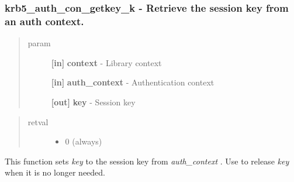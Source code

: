 \documentclass[letterpaper,10pt,english]{sphinxmanual}
\begin{document}
\subsubsection{krb5\_auth\_con\_getkey\_k -  Retrieve the session key from an auth context.}
\label{appdev/refs/api/krb5_auth_con_getkey_k:krb5-auth-con-getkey-k-retrieve-the-session-key-from-an-auth-context}\label{appdev/refs/api/krb5_auth_con_getkey_k::doc}

\begin{fulllineitems}
\label{appdev/refs/api/krb5_auth_con_getkey_k:c.krb5_auth_con_getkey_k}
\end{fulllineitems}

\begin{quote}\begin{description}
\item[{param}] \leavevmode
\textbf{{[}in{]}} \textbf{context} - Library context

\textbf{{[}in{]}} \textbf{auth\_context} - Authentication context

\textbf{{[}out{]}} \textbf{key} - Session key

\end{description}\end{quote}
\begin{quote}\begin{description}
\item[{retval}] \leavevmode\begin{itemize}
\item {} 
0   (always)

\end{itemize}

\end{description}\end{quote}

This function sets \emph{key} to the session key from \emph{auth\_context} . Use {\hyperref[appdev/refs/api/krb5_k_free_key:c.krb5_k_free_key]{}} to release \emph{key} when it is no longer needed.
\end{document}
